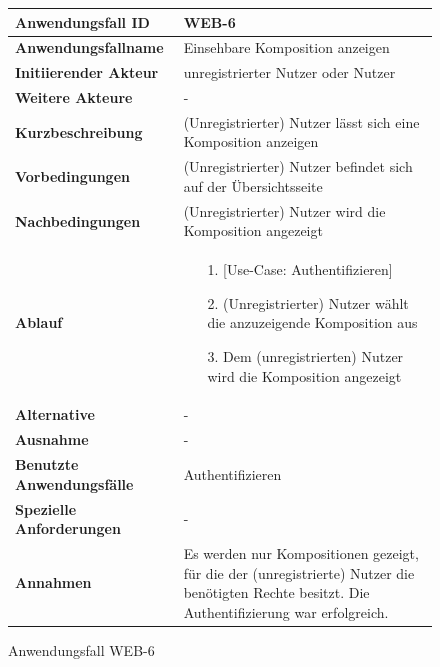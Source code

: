 \begin{figure}[h]
	\centering
	\begin{tabularx}{\textwidth}{ X | X }
		\textbf{Anwendungsfall ID} & WEB-6 \\ \hline
		\textbf{Anwendungsfallname} & Einsehbare Komposition anzeigen \\ \hline
		\textbf{Initiierender Akteur} & unregistrierter Nutzer oder Nutzer\\ \hline
		\textbf{Weitere Akteure} & - \\ \hline
		\textbf{Kurzbeschreibung} & (Unregistrierter) Nutzer  lässt sich eine Komposition anzeigen \\ \hline
		\textbf{Vorbedingungen} & (Unregistrierter) Nutzer befindet sich auf der Übersichtsseite \\ \hline
		\textbf{Nachbedingungen} & (Unregistrierter) Nutzer wird die Komposition angezeigt \\ \hline
		\textbf{Ablauf} &
		\begin{enumerate}
			\item[1.] [Use-Case: Authentifizieren]
			\item[2.] (Unregistrierter) Nutzer wählt die anzuzeigende Komposition aus
			\item[3.] Dem (unregistrierten) Nutzer wird die Komposition angezeigt
		\end{enumerate} \\ \hline
		\textbf{Alternative} & - \\ \hline
		\textbf{Ausnahme} & - \\ \hline
		\textbf{Benutzte Anwendungsfälle} & Authentifizieren \\ \hline
		\textbf{Spezielle Anforderungen} & - \\ \hline
		\textbf{Annahmen} & Es werden nur Kompositionen gezeigt, für die der (unregistrierte) Nutzer die benötigten Rechte besitzt. Die Authentifizierung war erfolgreich.
	\end{tabularx}
	\caption{Anwendungsfall WEB-6}
	\label{fig:anwendungsfall-server-tabelle-web-6}
\end{figure}
